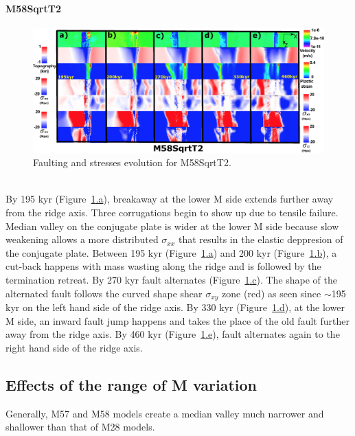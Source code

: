 \paragraph{M58SqrtT2}\label{para_M58SqrtT2}

\begin{figure}[h]
 \centering
  \includegraphics[width=1.0\textwidth]{./Figures/fig_Results_Weakening_8_M58SqrtT2_time_evolution.eps}
 \caption{Faulting and stresses evolution for M58SqrtT2.}
\label{fig_Results_Weakenging_8}
\end{figure}

~\\
By 195 kyr (Figure~\hyperref[fig_Results_Weakenging_8]{\ref{fig_Results_Weakenging_8}.a}), breakaway at the lower M side extends further away from the ridge axis. Three corrugations begin to show up due to tensile failure. Median valley on the conjugate plate is wider at the lower M side because slow weakening allows a more distributed $\sigma_{xx}$ that results in the elastic deppresion of the conjugate plate. Between 195 kyr (Figure~\hyperref[fig_Results_Weakenging_8]{\ref{fig_Results_Weakenging_8}.a}) and 200 kyr (Figure~\hyperref[fig_Results_Weakenging_8]{\ref{fig_Results_Weakenging_8}.b}),  a cut-back happens with mass wasting along the ridge and is followed by the termination retreat. By 270 kyr fault alternates (Figure~\hyperref[fig_Results_Weakenging_8]{\ref{fig_Results_Weakenging_8}.c}). The shape of the alternated fault follows the curved shape shear $\sigma_{xy}$ zone (red) as seen since $\sim$195 kyr on the left hand side of the ridge axis. By 330 kyr (Figure~\hyperref[fig_Results_Weakenging_8]{\ref{fig_Results_Weakenging_8}.d}), at the lower M side, an inward fault jump happens and takes the place of the old fault further away from the ridge axis. By 460 kyr (Figure~\hyperref[fig_Results_Weakenging_8]{\ref{fig_Results_Weakenging_8}.e}), fault alternates again to the right hand side of the ridge axis.

\subsection{Effects of the range of M variation}
Generally, M57 and M58 models create a median valley much narrower and shallower than that of M28 models.

